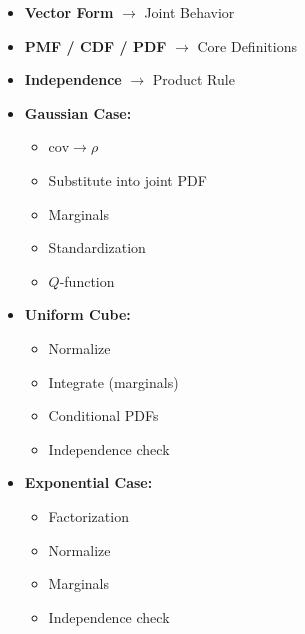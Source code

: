 \documentclass[12pt]{article}
\begin{document}
\begin{itemize}
    \item \textbf{Vector Form} $\rightarrow$ Joint Behavior
    
    \item \textbf{PMF / CDF / PDF} $\rightarrow$ Core Definitions
    
    \item \textbf{Independence} $\rightarrow$ Product Rule
    
    \item \textbf{Gaussian Case:}
    \begin{itemize}
        \item $\text{cov} \rightarrow \rho$
        \item Substitute into joint PDF
        \item Marginals
        \item Standardization
        \item $Q$-function
    \end{itemize}
    
    \item \textbf{Uniform Cube:}
    \begin{itemize}
        \item Normalize
        \item Integrate (marginals)
        \item Conditional PDFs
        \item Independence check
    \end{itemize}
    
    \item \textbf{Exponential Case:}
    \begin{itemize}
        \item Factorization
        \item Normalize
        \item Marginals
        \item Independence check
    \end{itemize}
    
\end{itemize}
\end{document}
